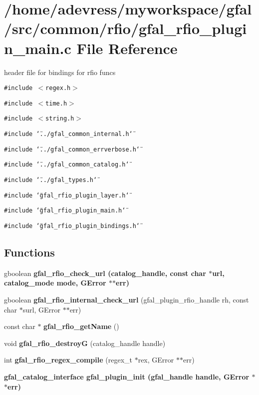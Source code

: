\section{/home/adevress/myworkspace/gfal/src/common/rfio/gfal\_\-rfio\_\-plugin\_\-main.c File Reference}
\label{gfal__rfio__plugin__main_8c}
header file for bindings for rfio funcs 

{\tt \#include $<$regex.h$>$}\par
{\tt \#include $<$time.h$>$}\par
{\tt \#include $<$string.h$>$}\par
{\tt \#include \char`\"{}../gfal\_\-common\_\-internal.h\char`\"{}}\par
{\tt \#include \char`\"{}../gfal\_\-common\_\-errverbose.h\char`\"{}}\par
{\tt \#include \char`\"{}../gfal\_\-common\_\-catalog.h\char`\"{}}\par
{\tt \#include \char`\"{}../gfal\_\-types.h\char`\"{}}\par
{\tt \#include \char`\"{}gfal\_\-rfio\_\-plugin\_\-layer.h\char`\"{}}\par
{\tt \#include \char`\"{}gfal\_\-rfio\_\-plugin\_\-main.h\char`\"{}}\par
{\tt \#include \char`\"{}gfal\_\-rfio\_\-plugin\_\-bindings.h\char`\"{}}\par
\subsection*{Functions}
\begin{CompactItemize}
\item 
gboolean \bf{gfal\_\-rfio\_\-check\_\-url} (catalog\_\-handle, const char $\ast$url, catalog\_\-mode mode, GError $\ast$$\ast$err)
\item 
gboolean \textbf{gfal\_\-rfio\_\-internal\_\-check\_\-url} (gfal\_\-plugin\_\-rfio\_\-handle rh, const char $\ast$surl, GError $\ast$$\ast$err)\label{gfal__rfio__plugin__main_8c_4d6d0d6d7f4bdfa39ceac7ac58cceabc}

\item 
const char $\ast$ \textbf{gfal\_\-rfio\_\-get\-Name} ()\label{gfal__rfio__plugin__main_8c_52d0ae5bb90146d1c3859f7eafa517fa}

\item 
void \textbf{gfal\_\-rfio\_\-destroy\-G} (catalog\_\-handle handle)\label{gfal__rfio__plugin__main_8c_5d5e134df56b9dab9254ac9ba04c7671}

\item 
int \textbf{gfal\_\-rfio\_\-regex\_\-compile} (regex\_\-t $\ast$rex, GError $\ast$$\ast$err)\label{gfal__rfio__plugin__main_8c_8d2d826bd27dfab8db31fda65727b6a2}

\item 
\bf{gfal\_\-catalog\_\-interface} \bf{gfal\_\-plugin\_\-init} (gfal\_\-handle handle, GError $\ast$$\ast$err)
\end{CompactItemize}


